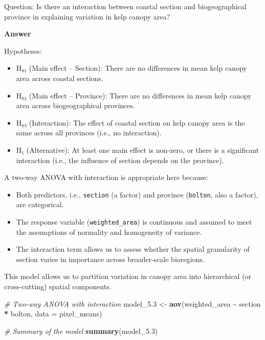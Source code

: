 \documentclass[
  british,
  10pt,
]{article}
\newenvironment{Shaded}{\begin{snugshade}}{\end{snugshade}}
\newcommand{\AttributeTok}[1]{\textcolor[rgb]{0.13,0.29,0.53}{#1}}
\newcommand{\CommentTok}[1]{\textcolor[rgb]{0.56,0.35,0.01}{\textit{#1}}}
\newcommand{\FloatTok}[1]{\textcolor[rgb]{0.00,0.00,0.81}{#1}}
\newcommand{\FunctionTok}[1]{\textcolor[rgb]{0.13,0.29,0.53}{\textbf{#1}}}
\newcommand{\NormalTok}[1]{#1}
\newcommand{\OtherTok}[1]{\textcolor[rgb]{0.56,0.35,0.01}{#1}}
\newcommand{\SpecialCharTok}[1]{\textcolor[rgb]{0.81,0.36,0.00}{\textbf{#1}}}
\providecommand{\tightlist}{%
  \setlength{\itemsep}{0pt}\setlength{\parskip}{0pt}}
\let\oldtexttt\texttt
\renewcommand{\texttt}[1]{\oldtexttt{\small #1}}
\begin{document}
Question: Is there an interaction between coastal section and
biogeographical province in explaining variation in kelp canopy area?

\textbf{Answer}

Hypotheses:

\begin{itemize}
\tightlist
\item
  H₀₁ (Main effect -- Section): There are no differences in mean kelp
  canopy area across coastal sections.
\item
  H₀₂ (Main effect -- Province): There are no differences in mean kelp
  canopy area across biogeographical provinces.
\item
  H₀₃ (Interaction): The effect of coastal section on kelp canopy area
  is the same across all provinces (i.e., no interaction).
\item
  H₁ (Alternative): At least one main effect is non-zero, or there is a
  significant interaction (i.e., the influence of section depends on the
  province).
\end{itemize}

A two-way ANOVA with interaction is appropriate here because:

\begin{itemize}
\tightlist
\item
  Both predictors, i.e., \texttt{section} (a factor) and province
  (\texttt{bolton}, also a factor), are categorical.
\item
  The response variable (\texttt{weighted\_area}) is continuous and
  assumed to meet the assumptions of normality and homogeneity of
  variance.
\item
  The interaction term allows us to assess whether the spatial
  granularity of section varies in importance across broader-scale
  bioregions.
\end{itemize}

This model allows us to partition variation in canopy area into
hierarchical (or cross-cutting) spatial components.

\begin{Shaded}
\begin{Highlighting}[]
\CommentTok{\# Two{-}way ANOVA with interaction}
\NormalTok{model\_5}\FloatTok{.3} \OtherTok{\textless{}{-}} \FunctionTok{aov}\NormalTok{(weighted\_area }\SpecialCharTok{\textasciitilde{}}\NormalTok{ section }\SpecialCharTok{*}\NormalTok{ bolton, }\AttributeTok{data =}\NormalTok{ pixel\_means)}

\CommentTok{\# Summary of the model}
\FunctionTok{summary}\NormalTok{(model\_5}\FloatTok{.3}\NormalTok{)}
\end{Highlighting}
\end{Shaded}
\end{document}
